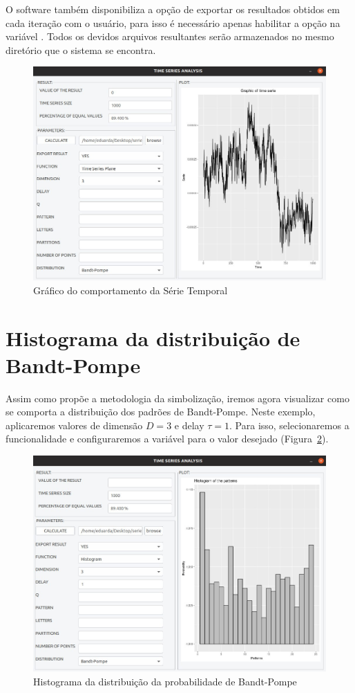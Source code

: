 O software também disponibiliza a opção de exportar os resultados obtidos em cada iteração com o usuário, para isso é necessário apenas habilitar a opção na variável . Todos os devidos arquivos resultantes serão armazenados no mesmo diretório que o sistema se encontra.

\begin{figure}[H]
	\centering
	\includegraphics[width=0.85\columnwidth]{capitulos/imagens/timeSeriesPlot} 
    \caption{Gráfico do comportamento da Série Temporal}
    \label{fig:TimeSerie}
\end{figure}

\section{Histograma da distribuição de Bandt-Pompe} 

Assim como propõe a metodologia da simbolização, iremos agora visualizar como se comporta a distribuição dos padrões de Bandt-Pompe. Neste exemplo, aplicaremos valores de dimensão $D = 3$ e delay $\tau = 1$. Para isso, selecionaremos a funcionalidade  e configuraremos a variável  para o valor desejado (Figura~\ref{fig:bandtPompe}).

\begin{figure}[H]
	\centering
	\includegraphics[width=0.85\columnwidth]{capitulos/imagens/Histogram} 
    \caption{Histograma da distribuição da probabilidade de Bandt-Pompe}
    \label{fig:bandtPompe}
\end{figure}

